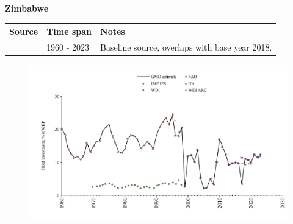 \documentclass[12pt,a4paper,landscape]{article}
\begin{document}
\begin{adjustbox}{max totalsize={\paperwidth}{\paperheight},center}
\begin{minipage}[t][\textheight][t]{\textwidth}
\vspace*{0.5cm}
{}
\begin{center}
{\Large\bfseries Zimbabwe}
\end{center}
\vspace{0.5cm}
\begin{table}[H]
\centering
\small
\begin{tabular}{|l|l|l|}
\hline
\textbf{Source} & \textbf{Time span} & \textbf{Notes} \\
\hline
\rowcolor{white}\cite{WDI}& 1960 - 2023 &Baseline source, overlaps with base year 2018.\\
\hline
\end{tabular}
\end{table}
\begin{figure}[H]
\centering
\includegraphics[width=\textwidth,height=0.6\textheight,keepaspectratio]{graphs/ZWE_finv_GDP.pdf}
\end{figure}
\end{minipage}
\end{adjustbox}
\end{document}
